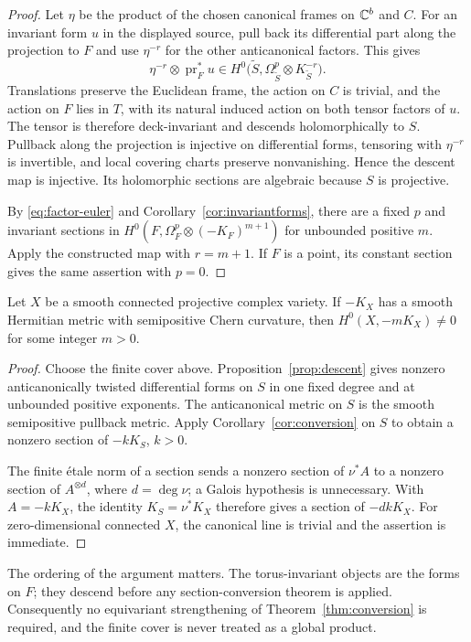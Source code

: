 \begin{proof}
Let \(\eta\) be the product of the chosen canonical frames on
\(\mathbb C^b\) and \(C\). For an invariant form \(u\) in the displayed
source, pull back its differential part along the projection to \(F\)
and use \(\eta^{-r}\) for the other anticanonical factors. This gives
\[
\eta^{-r}\otimes\operatorname{pr}_F^*u
\in H^0\bigl(\widetilde S,
\Omega_{\widetilde S}^p\otimes K_{\widetilde S}^{-r}\bigr).
\]
Translations preserve the Euclidean frame, the action on \(C\) is
trivial, and the action on \(F\) lies in \(T\), with its natural induced
action on both tensor factors of \(u\). The tensor is therefore
deck-invariant and descends holomorphically to \(S\). Pullback along
the projection is injective on differential forms, tensoring with
\(\eta^{-r}\) is invertible, and local covering charts preserve
nonvanishing. Hence the descent map is injective. Its holomorphic
sections are algebraic because \(S\) is projective.

By \eqref{eq:factor-euler} and Corollary~\ref{cor:invariantforms}, there
are a fixed \(p\) and invariant sections in
\(H^0(F,\Omega_F^p\otimes(-K_F)^{m+1})\) for unbounded positive
\(m\). Apply the constructed map with \(r=m+1\). If \(F\) is a
point, its constant section gives the same assertion with \(p=0\).
\end{proof}

\begin{corollary}\label{cor:global}
Let \(X\) be a smooth connected projective complex variety. If
\(-K_X\) has a smooth Hermitian metric with semipositive Chern
curvature, then \(H^0(X,-mK_X)\ne0\) for some integer \(m>0\).
\end{corollary}

\begin{proof}
Choose the finite cover above. Proposition~\ref{prop:descent} gives
nonzero anticanonically twisted differential forms on \(S\) in one
fixed degree and at unbounded positive exponents. The anticanonical
metric on \(S\) is the smooth semipositive pullback metric. Apply
Corollary~\ref{cor:conversion} on \(S\) to obtain a nonzero section of
\(-kK_S\), \(k>0\).

The finite \'etale norm of a section
\cite[Lemma~(Finite \'etale norm)]{CompanionH} sends a nonzero section of
\(\nu^*A\) to a nonzero section of \(A^{\otimes d}\), where
\(d=\deg\nu\); a Galois hypothesis is unnecessary. With
\(A=-kK_X\), the identity \(K_S=\nu^*K_X\) therefore gives a section
of \(-dkK_X\). For zero-dimensional connected \(X\), the canonical
line is trivial and the assertion is immediate.
\end{proof}

The ordering of the argument matters. The torus-invariant objects are
the forms on \(F\); they descend before any section-conversion theorem
is applied. Consequently no equivariant strengthening of
Theorem~\ref{thm:conversion} is required, and the finite cover is never
treated as a global product.

